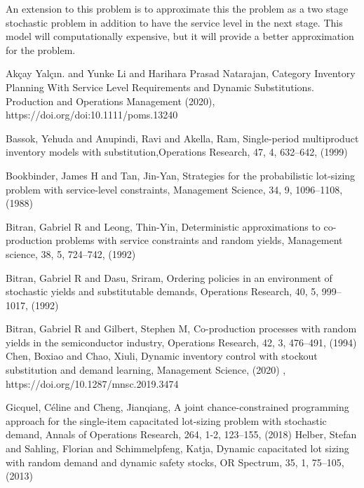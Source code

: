 \documentclass[10pt]{article}
\begin{document}
An extension to this problem is to approximate this the problem as a two stage stochastic problem in addition to have the service level in the next stage. This model will computationally expensive, but it will provide a better approximation for the problem.

\begin{thebibliography}{99}






Akçay Yalçın. and Yunke Li and Harihara Prasad Natarajan, Category Inventory Planning With
Service Level Requirements and Dynamic Substitutions.
Production and Operations Management (2020), https://doi.org/doi:10.1111/poms.13240

Bassok, Yehuda and Anupindi, Ravi and Akella, Ram,
Single-period multiproduct inventory models with substitution,Operations Research, 47, 4, 632--642, (1999)
 

 Bookbinder, James H and Tan, Jin-Yan, Strategies for the probabilistic lot-sizing problem with service-level constraints, Management Science, 34, 9, 1096--1108,
 (1988)


Bitran, Gabriel R and Leong, Thin-Yin, Deterministic approximations to co-production problems with service constraints and random yields, Management science, 38, 5, 724--742, (1992)
  
  
Bitran, Gabriel R and Dasu, Sriram, Ordering policies in an environment of stochastic yields and substitutable demands,
Operations Research,
40, 5,
999--1017, (1992)

Bitran, Gabriel R and Gilbert, Stephen M,
  Co-production processes with random yields in the semiconductor industry, Operations Research, 42, 3, 476--491, (1994)
Chen, Boxiao and Chao, Xiuli, Dynamic inventory control with stockout substitution and demand learning, Management Science, (2020) , https://doi.org/10.1287/mnsc.2019.3474

Gicquel, C{\'e}line and Cheng, Jianqiang, A joint chance-constrained programming approach for the single-item capacitated lot-sizing problem with stochastic demand, Annals of Operations Research, 264, 1-2, 123--155, (2018)
 Helber, Stefan and Sahling, Florian and Schimmelpfeng, Katja, Dynamic capacitated lot sizing with random demand and dynamic safety stocks, OR Spectrum, 35, 1, 75--105, (2013)
 


\end{thebibliography}
\end{document}
